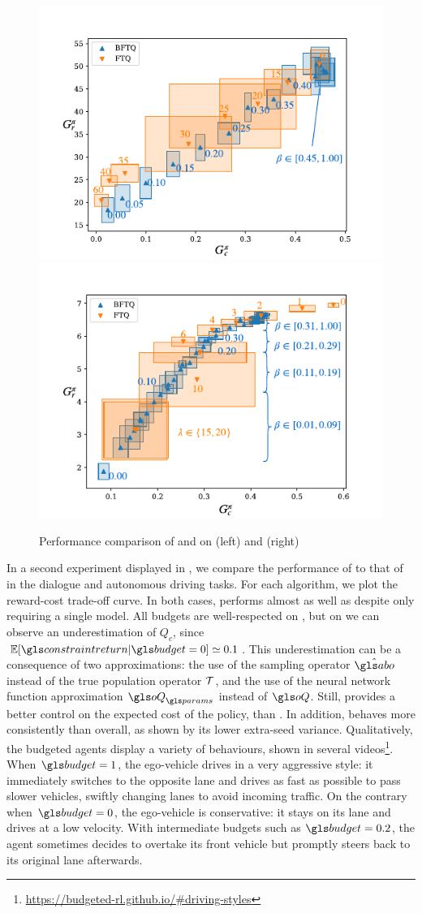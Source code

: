 \begin{figure}[th]
	\begin{center}
		\includegraphics[width=0.49\linewidth]{img/slot-filling}
		\includegraphics[width=0.49\linewidth]{img/highway}
		\caption{Performance comparison of \FTQl and \BFTQ on  (left) and (right) }
		\label{sec:brl-results}
	\end{center}
\end{figure}

In a second experiment displayed in , we compare the performance of \FTQl to that of \BFTQ in the dialogue and autonomous driving tasks. 
For each algorithm, we plot the reward-cost trade-off curve. In both cases, \BFTQ performs almost as well as \FTQl despite only requiring a single model. All budgets are well-respected on , but on  we can observe an underestimation of $Q_c$, since \eg $\expectedvalue[\constraintreturn|\budget=0] \simeq 0.1 $. This underestimation can be a consequence of two approximations: the use of the sampling operator $\hat{\abo}$ instead of the true population operator $\mathcal{T}$, and the use of the neural network function approximation $\oQ_\params$ instead of $\oQ$.
Still, \BFTQ provides a better control on the expected cost of the policy, than \FTQl. In addition, \BFTQ behaves more consistently than \FTQl overall, as shown by its lower extra-seed variance.
Qualitatively, the budgeted agents display a variety of behaviours, shown in several videos\footnote{\href{https://budgeted-rl.github.io/\#driving-styles}{https://budgeted-rl.github.io/\#driving-styles}}. When $\budget = 1$, the ego-vehicle drives in a very aggressive style: it immediately switches to the opposite lane and drives as fast as possible to pass slower vehicles, swiftly changing lanes to avoid incoming traffic. On the contrary when $\budget = 0$, the ego-vehicle is conservative: it stays on its lane and drives at a low velocity. With intermediate budgets such as $\budget = 0.2$, the agent sometimes decides to overtake its front vehicle but promptly steers back to its original lane afterwards.

